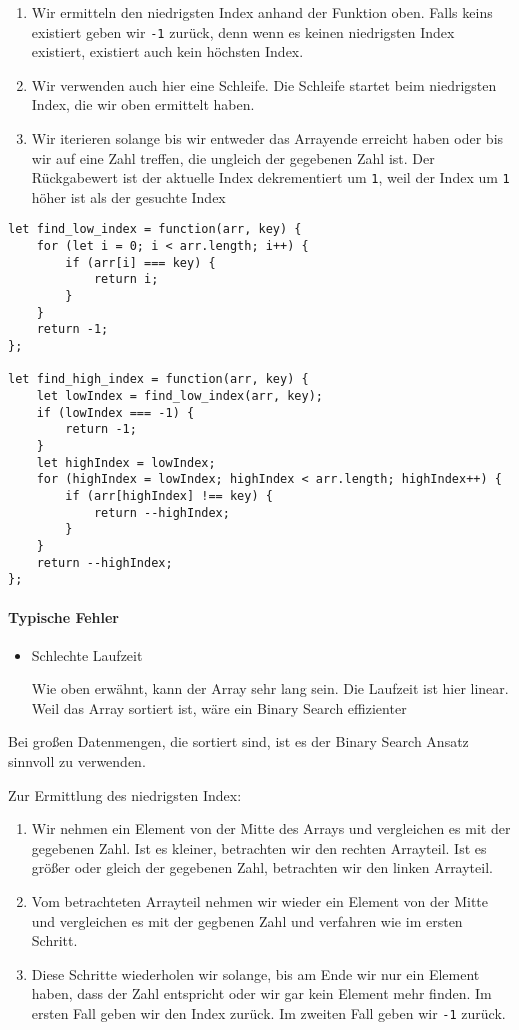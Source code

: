 \documentclass{book}
\begin{document}
\begin{enumerate} 
	\item Wir ermitteln den niedrigsten Index anhand der Funktion oben. Falls keins existiert geben wir \lstinline|-1| zurück, denn wenn es keinen niedrigsten Index existiert, existiert auch kein höchsten Index. 
	\item Wir verwenden auch hier eine Schleife. Die Schleife startet beim niedrigsten Index, die wir oben ermittelt haben. 
	\item Wir iterieren solange bis wir entweder das Arrayende erreicht haben oder bis wir auf eine Zahl treffen, die ungleich der gegebenen Zahl ist. Der Rückgabewert ist der aktuelle Index dekrementiert um \lstinline|1|, weil der Index um \lstinline|1| höher ist als der gesuchte Index
\end{enumerate}

\begin{lstlisting}[caption=My Javascript Example]
let find_low_index = function(arr, key) {
	for (let i = 0; i < arr.length; i++) {
		if (arr[i] === key) {
			return i;
		}
	}
	return -1;
};

let find_high_index = function(arr, key) {
	let lowIndex = find_low_index(arr, key);
	if (lowIndex === -1) {
		return -1;
	}
	let highIndex = lowIndex;
	for (highIndex = lowIndex; highIndex < arr.length; highIndex++) {
		if (arr[highIndex] !== key) {
			return --highIndex;
		}
	}
	return --highIndex;
};
\end{lstlisting}

\paragraph{Typische Fehler}
\begin{itemize} 
	\item Schlechte Laufzeit
	
	Wie oben erwähnt, kann der Array sehr lang sein. Die Laufzeit ist hier linear. Weil das Array sortiert ist, wäre ein Binary Search effizienter
	
\end{itemize}

Bei großen Datenmengen, die sortiert sind, ist es der Binary Search Ansatz sinnvoll zu verwenden.

Zur Ermittlung des niedrigsten Index:
\begin{enumerate}
	\item Wir nehmen ein Element von der Mitte des Arrays und vergleichen es mit der gegebenen Zahl. Ist es kleiner, betrachten wir den rechten Arrayteil. Ist es größer oder gleich der gegebenen Zahl, betrachten wir den linken Arrayteil.
	\item Vom betrachteten Arrayteil nehmen wir wieder ein Element von der Mitte und vergleichen es mit der gegbenen Zahl und verfahren wie im ersten Schritt.
	\item Diese Schritte wiederholen wir solange, bis am Ende wir nur ein Element haben, dass der Zahl entspricht oder wir gar kein Element mehr finden. Im ersten Fall geben wir den Index zurück. Im zweiten Fall geben wir \lstinline|-1| zurück.
\end{enumerate}
\end{document}
